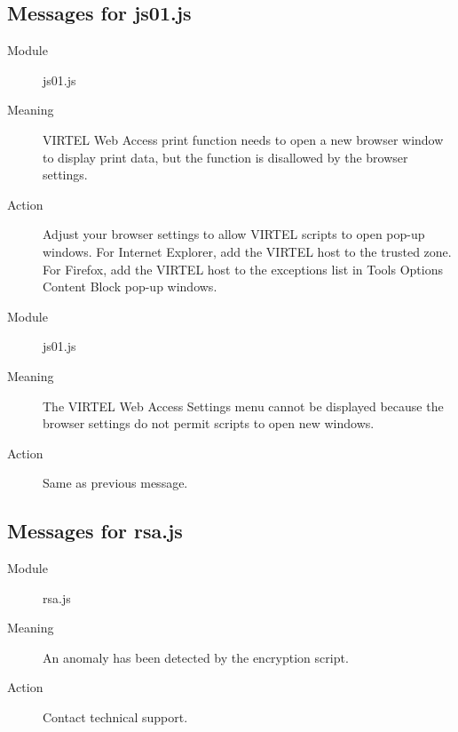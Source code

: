 \documentclass[letterpaper,10pt,english]{sphinxmanual}
\begin{document}
\subsection{Messages for js01.js}
\label{\detokenize{messages:messages-for-js01-js}}
\begin{description}
\item[{Module}] \leavevmode
js01.js

\item[{Meaning}] \leavevmode
VIRTEL Web Access print function needs to open a new browser window to display print data, but the function is disallowed by the browser settings.

\item[{Action}] \leavevmode
Adjust your browser settings to allow VIRTEL scripts to open pop-up windows. For Internet Explorer, add the VIRTEL host to the trusted zone. For Firefox, add the VIRTEL host to the exceptions list in Tools \textendash{} Options \textendash{} Content \textendash{} Block pop-up windows.

\end{description}

\begin{description}
\item[{Module}] \leavevmode
js01.js

\item[{Meaning}] \leavevmode
The VIRTEL Web Access Settings menu cannot be displayed because the browser settings do not permit scripts to open new windows.

\item[{Action}] \leavevmode
Same as previous message.

\end{description}


\subsection{Messages for rsa.js}
\label{\detokenize{messages:messages-for-rsa-js}}
\begin{description}
\item[{Module}] \leavevmode
rsa.js

\item[{Meaning}] \leavevmode
An anomaly has been detected by the encryption script.

\item[{Action}] \leavevmode
Contact technical support.

\end{description}
\end{document}
